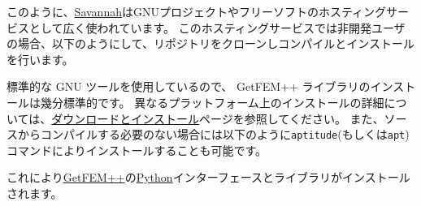 \documentclass{../../style/ltjoc}
\begin{document}
このように、\href{https://savannah.gnu.org}{Savannah}はGNUプロジェクトやフリーソフトのホスティングサービスとして広く使われています。
このホスティングサービスでは非開発ユーザの場合、以下のようにして、リポジトリをクローンしコンパイルとインストールを行います。
\begin{shbox}
\end{shbox}
標準的な GNU ツールを使用しているので、 GetFEM++ ライブラリのインストールは幾分標準的です。
異なるプラットフォーム上のインストールの詳細については、\href{http://getfem.org/download.html}{ダウンロードとインストール}ページを参照してください。
また、ソースからコンパイルする必要のない場合には以下のように\texttt{aptitude}(もしくは\texttt{apt})コマンドによりインストールすることも可能です。
\begin{shbox}
\end{shbox}
これにより\href{http://getfem.org}{GetFEM++}の\href{https://www.python.org/}{Python}インターフェースとライブラリがインストールされます。
\end{document}
